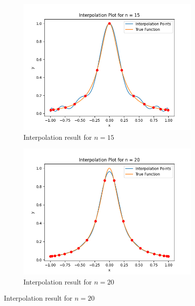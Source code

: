 \documentclass[a4paper]{article}
\begin{document}
\begin{figure}[htbp]
    \begin{subfigure}[b]{0.48\textwidth}
        \includegraphics[width = \textwidth]{../results/Task_C/Interpolation_Plot_n_15.png}
        \caption{Interpolation result for $n = 15$}
    \end{subfigure}
    \hfill
    \begin{subfigure}[b]{0.48\textwidth}
        \includegraphics[width = \textwidth]{../results/Task_C/Interpolation_Plot_n_20.png}
        \caption{Interpolation result for $n = 20$}
    \end{subfigure}


\end{figure}
\end{document}

